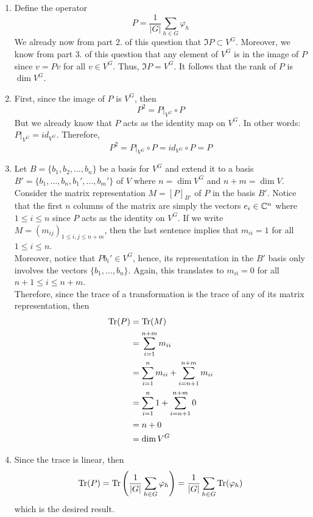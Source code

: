 \begin{solution}
\begin{enumerate}
        \item Define the operator 
        $$P = \frac{1}{|G|}\sum_{h \in G}\varphi_h$$
        We already now from part 2. of this question that $\Im{P} \subset V^G$. Moreover, we know from part 3. of this question that any element of $V^G$ is in the image of $P$ since $v = Pv$ for all $v \in V^G$. Thus, $\Im{P} = V^G$. It follows that the rank of $P$ is $\dim V^G$.
        \item First, since the image of $P$ is $V^G$, then
        $$P^2 = P|_{V^G} \circ P$$
        But we already know that $P$ acts as the identity map on $V^G$. In other words: $P|_{V^G} = id_{V^G}$. Therefore,
        $$P^2 = P|_{V^G} \circ P = id_{V^G} \circ P = P$$
        \item Let $B = \{b_1, b_2, ..., b_n\}$ be a basis for $V^G$ and extend it to a basis $B' = \{b_1, ..., b_n, b_1', ..., b_m'\}$ of $V$ where $n = \dim V^G$ and $n+m = \dim V$. Consider the matrix representation $M = [P]_{B'}$ of $P$ in the basis $B'$. Notice that the first $n$ columns of the matrix are simply the vectors $e_i \in \mathbb{C}^n$ where $1 \leq i \leq n$ since $P$ acts as the identity on $V^G$. If we write $M = (m_{ij})_{1 \leq i,j \leq n+m}$, then the last sentence implies that $m_{ii} = 1$ for all $1\leq i \leq n$. \\ Moreover, notice that $Pb_i' \in V^G$, hence, its representation in the $B'$ basis only involves the vectors $\{b_1, ..., b_n\}$. Again, this translates to $m_{ii} = 0$ for all $n+1 \leq i \leq n+m$. \\
        Therefore, since the trace of a transformation is the trace of any of its matrix representation, then
        \begin{align*}
            \text{Tr}(P) &= \text{Tr}(M) \\
            &= \sum_{i=1}^{n+m}m_{ii} \\
            &= \sum_{i=1}^{n}m_{ii} + \sum_{i=n+1}^{n+m}m_{ii} \\
            &= \sum_{i=1}^{n}1 + \sum_{i=n+1}^{n+m}0 \\
            &= n + 0 \\
            &= \dim V^G
        \end{align*}
        \item Since the trace is linear, then
        $$ \text{Tr}(P) = \text{Tr} \left(\frac{1}{|G|}\sum_{h \in G}\varphi_h\right) = \frac{1}{|G|}\sum_{h \in G}\text{Tr}(\varphi_h)$$
        which is the desired result. \\
    \end{enumerate}
\end{solution}


